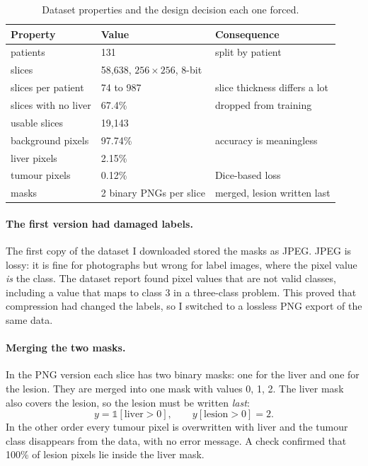 \documentclass[11pt,a4paper]{article}
\begin{document}
\begin{table}[H]
\centering\small
\begin{tabular}{lll}
\toprule
\textbf{Property} & \textbf{Value} & \textbf{Consequence} \\
\midrule
patients & 131 & split by patient \\
slices & 58{,}638, $256\times256$, 8-bit & \\
slices per patient & 74 to 987 & slice thickness differs a lot \\
slices with no liver & 67.4\% & dropped from training \\
usable slices & 19{,}143 & \\
background pixels & 97.74\% & accuracy is meaningless \\
liver pixels & 2.15\% & \\
tumour pixels & 0.12\% & Dice-based loss \\
masks & 2 binary PNGs per slice & merged, lesion written last \\
\bottomrule
\end{tabular}
\caption{Dataset properties and the design decision each one forced.}
\label{tab:seg_data}
\end{table}

\paragraph{The first version had damaged labels.} The first copy of the dataset
I downloaded stored the masks as JPEG. JPEG is lossy: it is fine for photographs
but wrong for label images, where the pixel value \emph{is} the class. The dataset
report found pixel values that are not valid classes, including a value that maps
to class 3 in a three-class problem. This proved that compression had changed the
labels, so I switched to a lossless PNG export of the same data.

\paragraph{Merging the two masks.} In the PNG version each slice has two binary
masks: one for the liver and one for the lesion. They are merged into one mask
with values 0, 1, 2. The liver mask also covers the lesion, so the lesion must be
written \emph{last}:
\[
y = \mathbb{1}[\text{liver} > 0], \qquad y[\text{lesion} > 0] = 2 .
\]
In the other order every tumour pixel is overwritten with liver and the tumour
class disappears from the data, with no error message. A check confirmed that
100\% of lesion pixels lie inside the liver mask.
\end{document}
